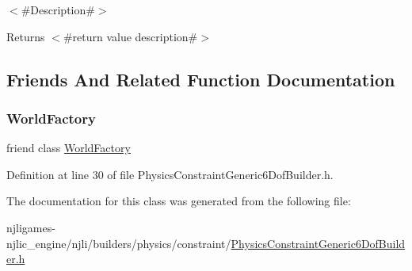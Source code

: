 $<$\#\+Description\#$>$

\begin{DoxyReturn}{Returns}
$<$\#return value description\#$>$ 
\end{DoxyReturn}


\subsection{Friends And Related Function Documentation}
\mbox{\label{classnjli_1_1_physics_constraint_generic6_dof_builder_acb96ebb09abe8f2a37a915a842babfac}} 
\subsubsection{\texorpdfstring{World\+Factory}{WorldFactory}}
{\footnotesize\ttfamily friend class \mbox{\hyperlink{classnjli_1_1_world_factory}{World\+Factory}}\hspace{0.3cm}{\ttfamily [friend]}}



Definition at line 30 of file Physics\+Constraint\+Generic6\+Dof\+Builder.\+h.



The documentation for this class was generated from the following file\+:\begin{DoxyCompactItemize}
\item 
njligames-\/njlic\+\_\+engine/njli/builders/physics/constraint/\mbox{\hyperlink{_physics_constraint_generic6_dof_builder_8h}{Physics\+Constraint\+Generic6\+Dof\+Builder.\+h}}\end{DoxyCompactItemize}
